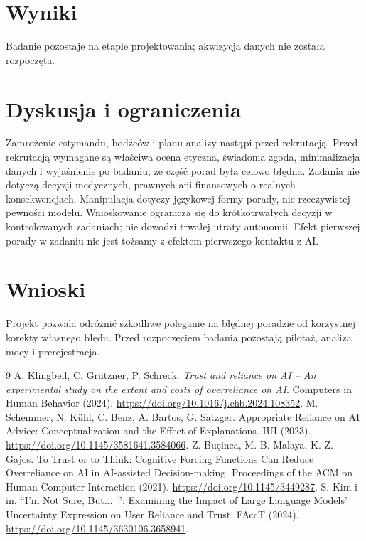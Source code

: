 \documentclass[11pt,a4paper]{article}
\begin{document}
\section{Wyniki}
Badanie pozostaje na etapie projektowania; akwizycja danych nie została rozpoczęta.
\section{Dyskusja i ograniczenia}
Zamrożenie estymandu, bodźców i planu analizy nastąpi przed rekrutacją. Przed rekrutacją wymagane są właściwa ocena etyczna, świadoma zgoda, minimalizacja danych i wyjaśnienie po badaniu, że część porad była celowo błędna. Zadania nie dotyczą decyzji medycznych, prawnych ani finansowych o realnych konsekwencjach. Manipulacja dotyczy językowej formy porady, nie rzeczywistej pewności modelu. Wnioskowanie ogranicza się do krótkotrwałych decyzji w kontrolowanych zadaniach; nie dowodzi trwałej utraty autonomii. Efekt pierwszej porady w zadaniu nie jest tożsamy z efektem pierwszego kontaktu z AI.
\section{Wnioski}
Projekt pozwala odróżnić szkodliwe poleganie na błędnej poradzie od korzystnej korekty własnego błędu. Przed rozpoczęciem badania pozostają pilotaż, analiza mocy i prerejestracja.
\begin{thebibliography}{9}
 A. Klingbeil, C. Grützner, P. Schreck. \emph{Trust and reliance on AI -- An experimental study on the extent and costs of overreliance on AI}. Computers in Human Behavior (2024). \url{https://doi.org/10.1016/j.chb.2024.108352}.
 M. Schemmer, N. Kühl, C. Benz, A. Bartos, G. Satzger. Appropriate Reliance on AI Advice: Conceptualization and the Effect of Explanations. IUI (2023). \url{https://doi.org/10.1145/3581641.3584066}.
 Z. Buçinca, M. B. Malaya, K. Z. Gajos. To Trust or to Think: Cognitive Forcing Functions Can Reduce Overreliance on AI in AI-assisted Decision-making. Proceedings of the ACM on Human-Computer Interaction (2021). \url{https://doi.org/10.1145/3449287}.
 S. Kim i in. ``I'm Not Sure, But...~'': Examining the Impact of Large Language Models' Uncertainty Expression on User Reliance and Trust. FAccT (2024). \url{https://doi.org/10.1145/3630106.3658941}.
\end{thebibliography}
\end{document}

